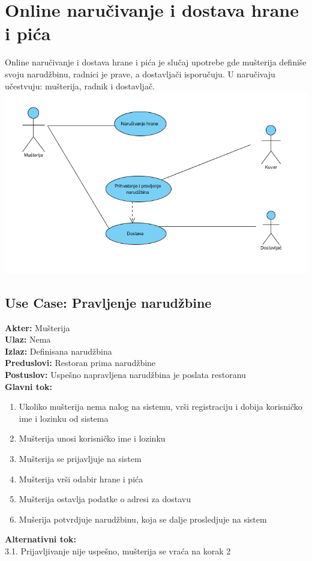 \documentclass{article}
\begin{document}
\section{Online naručivanje i dostava hrane i pića}
Online naručivanje i dostava hrane i pića je slučaj upotrebe gde mušterija definiše svoju narudžbinu, radnici je prave, a dostavljači isporučuju. U naručivaju učestvuju: mušterija, radnik i dostavljač.
\\
\includegraphics[width=\linewidth]{narucivanjeIdostava.png}


\subsection{\textbf{Use Case}: Pravljenje narudžbine}
\textbf{Akter:} Mušterija\\
\textbf{Ulaz:} Nema\\
\textbf{Izlaz:} Definisana narudžbina\\
\textbf{Preduslovi:} Restoran prima narudžbine\\
\textbf{Postuslov:} Uspešno napravljena narudžbina je poslata restoranu\\
\textbf{Glavni tok:}
\begin{enumerate}
\item Ukoliko mušterija nema nalog na sistemu, vrši registraciju i dobija korisničko ime i lozinku od sistema
\item Mušterija unosi korisničko ime i lozinku
\item Mušterija se prijavljuje na sistem
\item Mušterija vrši odabir hrane i pića
\item Mušterija ostavlja podatke o adresi za dostavu
\item Mušerija potvrdjuje narudžbinu, koja se dalje prosledjuje na sistem
\end{enumerate}
\textbf{Alternativni tok:} \\
        3.1. Prijavljivanje nije uspešno, mušterija se vraća na korak 2\\
\end{document}
